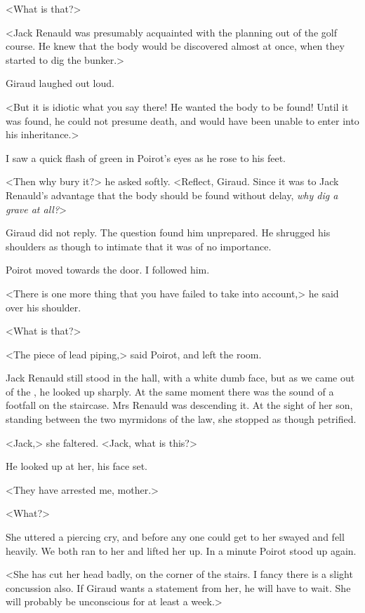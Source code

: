  <What is that?> 

 <Jack Renauld was presumably acquainted with the planning out of the golf course. He knew that the body would be discovered almost at once, when they started to dig the bunker.> 

 Giraud laughed out loud. 

 <But it is idiotic what you say there! He wanted the body to be found! Until it was found, he could not presume death, and would have been unable to enter into his inheritance.> 

 I saw a quick flash of green in Poirot's eyes as he rose to his feet. 

 <Then why bury it?> he asked softly. <Reflect, Giraud. Since it was to Jack Renauld's advantage that the body should be found without delay, \emph{why dig a grave at all?}> 

 Giraud did not reply. The question found him unprepared. He shrugged his shoulders as though to intimate that it was of no importance. 

 Poirot moved towards the door. I followed him. 

 <There is one more thing that you have failed to take into account,> he said over his shoulder. 

 <What is that?> 

 <The piece of lead piping,> said Poirot, and left the room. 

 Jack Renauld still stood in the hall, with a white dumb face, but as we came out of the , he looked up sharply. At the same moment there was the sound of a footfall on the staircase. Mrs Renauld was descending it. At the sight of her son, standing between the two myrmidons of the law, she stopped as though petrified. 

 <Jack,> she faltered. <Jack, what is this?> 

 He looked up at her, his face set. 

 <They have arrested me, mother.> 

 <What?> 

 She uttered a piercing cry, and before any one could get to her swayed and fell heavily. We both ran to her and lifted her up. In a minute Poirot stood up again. 

 <She has cut her head badly, on the corner of the stairs. I fancy there is a slight concussion also. If Giraud wants a statement from her, he will have to wait. She will probably be unconscious for at least a week.> 

